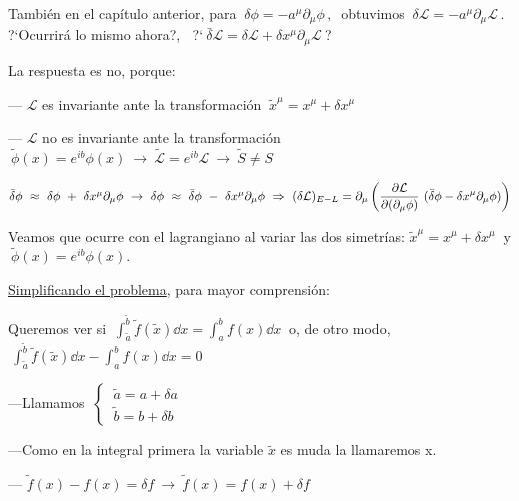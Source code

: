 También en el capítulo anterior, para $\ \delta \phi=-a^\mu \partial_\mu \phi\, , \ $ obtuvimos $\ \delta \mathcal L = -a^\mu \partial_\mu \mathcal L\, . \ $ ?`Ocurrirá lo mismo ahora?, $\ $ ?`$\  \bar \delta \mathcal L = \delta \mathcal L + \delta x^\mu \partial_\mu \mathcal L\ $?

La respuesta es no, porque:

\vspace{-3mm} \hspace{1cm} --- $\mathcal L$ es invariante ante la transformación $\ \tilde x^\mu=x^\mu +\delta x^\mu$

\vspace{-3mm} \hspace{1cm} --- $\mathcal L$ no es invariante ante la transformación $\ \tilde \phi(x)=e^{ib} \phi(x) \ \to \ \tilde {\mathcal L} =e^{ib} \mathcal L  \ \to \ \tilde S \neq S$

$\bar \delta \phi \ \approx \ \delta \phi \ + \ \delta x^\mu \partial_\mu \phi \ \to \ \delta \phi \ \approx \  \bar \delta \phi \ - \ \delta x^\mu \partial_\mu \phi \ \Rightarrow \ \displaystyle (\delta \mathcal L)_{E-L} = \partial_\mu  \left( \pdv{\mathcal L}{(\partial_\mu \phi)} \ 
(\bar \delta \phi - \delta x^\mu \partial_\mu \phi)
 \right)$

Veamos que ocurre con el lagrangiano al variar las dos simetrías: $\tilde x^\mu =x^\mu+\delta x^\mu \ $ y $ \ \tilde \phi(x)=e^{ib}\phi(x)$.

\underline{Simplificando el problema}, para mayor comprensión:

Queremos ver si $\ \displaystyle \int_{\tilde a}^{\tilde b} \tilde f(\tilde x)\dd x=\int_a^b f(x)\dd x \ $ o, de otro modo, $\ \displaystyle \int_{\tilde a}^{\tilde b} \tilde f(\tilde x)\dd x-\int_a^b f(x)\dd x=0$

\vspace{-3mm} \hspace{1cm} ---Llamamos $\ \begin{cases} \ \tilde a = a+\delta a \\ \ \tilde b = b+\delta b \end{cases}\ $ 

\vspace{-3mm} \hspace{1cm} ---Como en la integral primera la variable $\tilde x$ es muda la llamaremos x.

\vspace{-3mm} \hspace{1cm} --- $\tilde f(x)-f(x)=\delta f \ \to \ \tilde f(x)=f(x)+\delta f$

